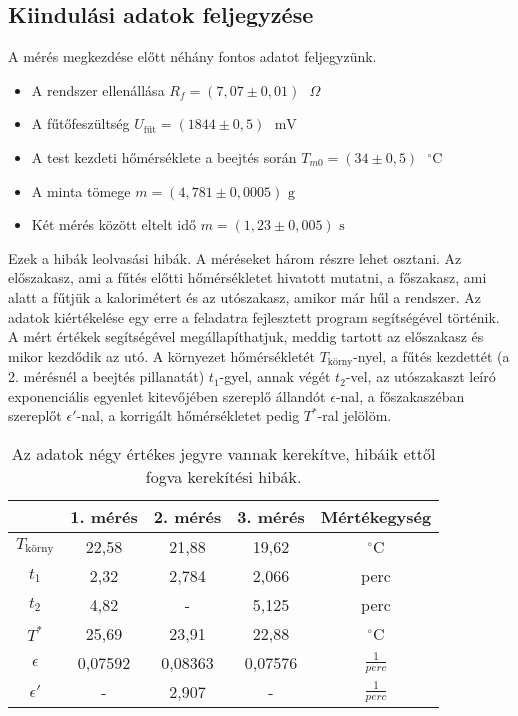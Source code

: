 \documentclass[a4paper, 12pt, oneside]{article}
\begin{document}
\subsection*{Kiindulási adatok feljegyzése}
    A mérés megkezdése előtt néhány fontos adatot feljegyzünk. 
\begin{itemize}
  \item A rendszer ellenállása $ R_f = (7,07  \pm 0,01)  \textrm{ } \Omega $
  \item A fűtőfeszültség $ U_{\textrm{fűt}} = (1844 \pm 0,5)\textrm{ } \textrm{mV} $
  \item A test kezdeti hőmérséklete a beejtés során $T_{m0} = (34 \pm 0,5) \textrm{ } ^\circ \textrm{C}$
  \item A minta tömege $m = (4,781 \pm 0,0005) \textrm{ g}$
  \item Két mérés között eltelt idő $m = (1,23 \pm 0,005) \textrm{ s}$
\end{itemize}
    Ezek a hibák leolvasási hibák.\bigskip \newline 
    A méréseket három részre lehet osztani. Az előszakasz, ami a fűtés előtti hőmérsékletet hivatott mutatni, a főszakasz, ami alatt a fűtjük a kalorimétert és az utószakasz, amikor már hűl a rendszer. Az adatok kiértékelése egy erre a feladatra fejlesztett program segítségével történik. A mért értékek segítségével megállapíthatjuk, meddig tartott az előszakasz és mikor kezdődik az utó.
    A környezet hőmérsékletét $T_\textrm{körny}$-nyel, a fűtés kezdettét (a 2. mérésnél a beejtés pillanatát) $t_1$-gyel, annak végét $t_2$-vel, az utószakaszt leíró exponenciális egyenlet kitevőjében szereplő állandót $\epsilon$-nal, a főszakaszéban szereplőt $\epsilon'$-nal, a korrigált hőmérsékletet pedig $T^*$-ral jelölöm.   
    \begin{table}[!h]
        \centering
        \begin{tabular}{|c|c|c|c|c|}
        \hline
                                   &1. mérés & 2. mérés & 3. mérés &Mértékegység\\
        \hline
             $T_\textrm{körny}$& 22,58   & 21,88    & 19,62    &${ ^\circ}$C\\
        \hline
             $t_1$             & 2,32   & 2,784    & 2,066    & perc\\
        \hline
             $t_2$             & 4,82   & -        & 5,125    & perc\\
        \hline
             $T^*$             & 25,69   & 23,91    & 22,88    & ${ ^\circ}$C\\
        \hline
             $\epsilon$        & 0,07592  & 0,08363  & 0,07576  & $\frac{1}{perc}$\\
        \hline
        $\epsilon '$            & -      & 2,907    & -        & $\frac{1}{perc}$\\
        \hline
        \end{tabular}
        \caption{Az adatok négy értékes jegyre vannak kerekítve, hibáik ettől fogva kerekítési hibák.}
    \end{table}
\end{document}
